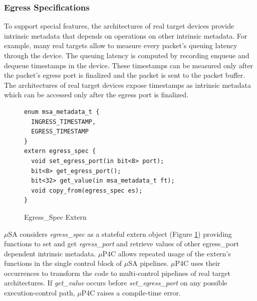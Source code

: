 \subsubsection{Egress Specifications}
To support special features, the architectures of real target devices provide intrinsic metadata  that depends on operations on other intrinsic metadata.
For example,  many real targets allow to measure every packet's queuing latency through the device.
The queuing latency is computed by recording enqueue and dequeue timestamps in the device.
These timestamps can be measured only after the packet's egress port is finalized and the packet is sent to the packet buffer.
The architectures of real target devices expose timestamps as intrinsic metadata which can be accessed only after the egress port is finalized.
\begin{figure}[!h]
\begin{lstlisting}[frame=none]
enum msa_metadata_t {
  INGRESS_TIMESTAMP,
  EGRESS_TIMESTAMP
}
extern egress_spec {
  void set_egress_port(in bit<8> port);
  bit<8> get_egress_port();
  bit<32> get_value(in msa_metadata_t ft);
  void copy_from(egress_spec es);
}
\end{lstlisting}
\caption{Egress\_Spec Extern}
\label{fig:msa-egress-spec-extern}
\end{figure}
$\mu$SA considers \emph{egress\_spec} as a stateful extern object (Figure \ref{fig:msa-egress-spec-extern}) providing functions to set and get \emph{egress\_port} and retrieve values of other egress\_port dependent intrinsic metadata.
$\mu$P4C allows repeated usage of the extern's functions in the single control block of $\mu$SA pipelines.
$\mu$P4C uses their occurrences to transform the code to multi-control pipelines of real target architectures.
If \emph{get\_value} occurs before \emph{set\_egress\_port} on any possible execution-control path, $\mu$P4C raises a compile-time error.

